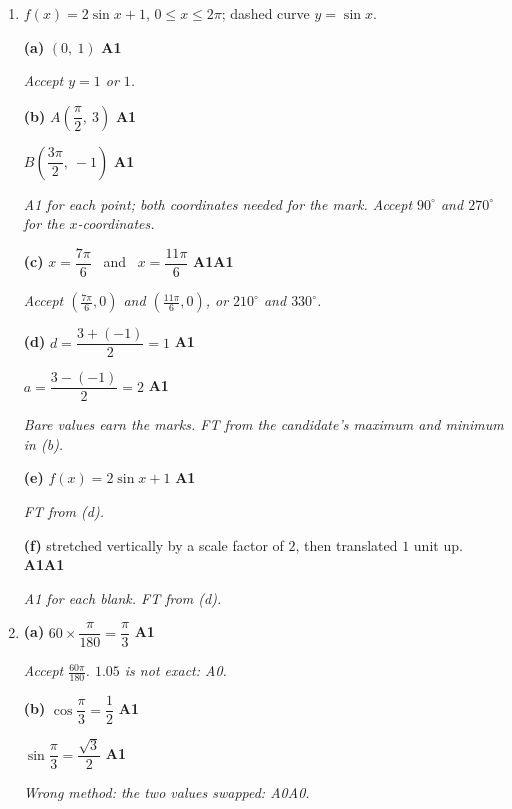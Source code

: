 \documentclass[12pt, twoside]{article}
\begin{document}
\begin{enumerate}[itemsep=0.3cm]

\item[1.] [Maximum mark: 10]

$f(x) = 2\sin x + 1$, $0 \le x \le 2\pi$; dashed curve $y = \sin x$.

\textbf{(a)} $(0,\ 1)$ \hfill \textbf{A1}

\emph{Accept $y = 1$ or $1$.}

\textbf{(b)} $A\left(\dfrac{\pi}{2},\ 3\right)$ \hfill \textbf{A1}

$B\left(\dfrac{3\pi}{2},\ -1\right)$ \hfill \textbf{A1}

\emph{A1 for each point; both coordinates needed for the mark. Accept
$90^\circ$ and $270^\circ$ for the $x$-coordinates.}

\textbf{(c)} $x = \dfrac{7\pi}{6}$ \ and \ $x = \dfrac{11\pi}{6}$
\hfill \textbf{A1A1}

\emph{Accept $\left(\frac{7\pi}{6}, 0\right)$ and
$\left(\frac{11\pi}{6}, 0\right)$, or $210^\circ$ and $330^\circ$.}

\textbf{(d)} $d = \dfrac{3 + (-1)}{2} = 1$ \hfill \textbf{A1}

$a = \dfrac{3 - (-1)}{2} = 2$ \hfill \textbf{A1}

\emph{Bare values earn the marks. FT from the candidate's maximum and
minimum in (b).}

\textbf{(e)} $f(x) = 2\sin x + 1$ \hfill \textbf{A1}

\emph{FT from (d).}

\textbf{(f)} stretched vertically by a scale factor of $2$, then translated
$1$ unit up. \hfill \textbf{A1A1}

\emph{A1 for each blank. FT from (d).}

\newpage

\item[2.] [Maximum mark: 9]

\textbf{(a)} $60 \times \dfrac{\pi}{180} = \dfrac{\pi}{3}$ \hfill \textbf{A1}

\emph{Accept $\frac{60\pi}{180}$. $1.05$ is not exact: A0.}

\textbf{(b)} $\cos\dfrac{\pi}{3} = \dfrac{1}{2}$ \hfill \textbf{A1}

$\sin\dfrac{\pi}{3} = \dfrac{\sqrt{3}}{2}$ \hfill \textbf{A1}

\emph{Wrong method: the two values swapped: A0A0.}


\end{enumerate}
\end{document}
